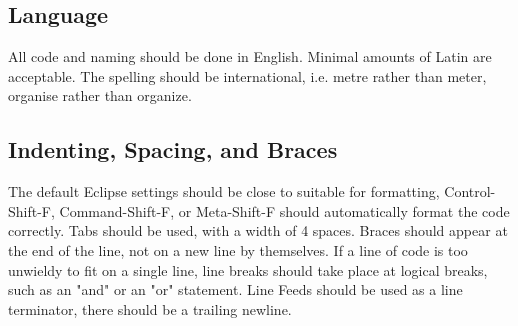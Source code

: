 \documentclass[]{report}
\begin{document}
\subsection{Language}
All code and naming should be done in English.
Minimal amounts of Latin are acceptable.
The spelling should be international, i.e. metre rather than meter, organise rather than organize.

\subsection{Indenting, Spacing, and Braces}
The default Eclipse settings should be close to suitable for formatting, Control-Shift-F, Command-Shift-F, or Meta-Shift-F should automatically format the code correctly.
Tabs should be used, with a width of 4 spaces.
Braces should appear at the end of the line, not on a new line by themselves.
If a line of code is too unwieldy to fit on a single line, line breaks should take place at logical breaks, such as an "and" or an "or" statement.
Line Feeds should be used as a line terminator, there should be a trailing newline.
\end{document}
